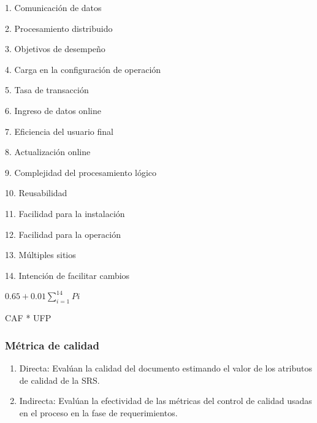         \par 1. Comunicación de datos
        \par 2. Procesamiento distribuido
        \par 3. Objetivos de desempeño
        \par 4. Carga en la configuración de operación
        \par 5. Tasa de transacción
        \par 6. Ingreso de datos online
        \par 7. Eficiencia del usuario final
        \par 8. Actualización online
        \par 9. Complejidad del procesamiento lógico
        \par 10. Reusabilidad
        \par 11. Facilidad para la instalación
        \par 12. Facilidad para la operación
        \par 13. Múltiples sitios
        \par 14. Intención de facilitar cambios

       \quad $0.65 + 0.01 \sum\limits_{i=1}^{14} Pi$

       CAF * UFP

    \subsubsection{Métrica de calidad}
      \begin{enumerate}[-]
        \item Directa: Evalúan la calidad del documento estimando el valor de los atributos de calidad de la SRS.
        \item Indirecta: Evalúan la efectividad de las métricas del control de calidad usadas en el proceso en la fase
              de requerimientos.
      \end{enumerate}
